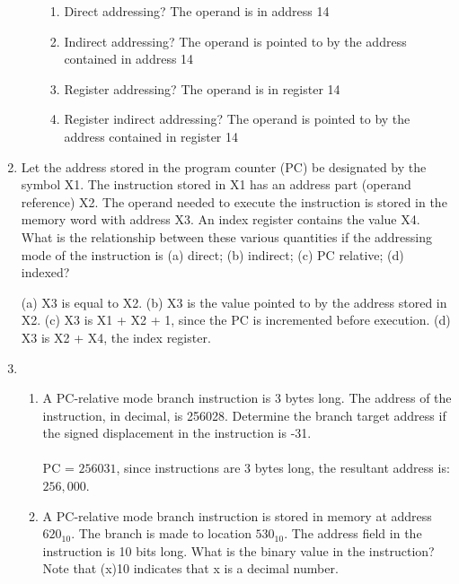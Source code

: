 \documentclass{article}
\begin{document}
\begin{enumerate}
\begin{enumerate}
\begin{enumerate}
			            \item Direct addressing?
			                  \newline The operand is in address 14

			            \item Indirect addressing?
			                  \newline The operand is pointed to by the address contained in address 14

			            \item Register addressing?
			                  \newline The operand is in register 14

			            \item Register indirect addressing?
			                  \newline The operand is pointed to by the address contained in register 14
		            \end{enumerate}
	      \end{enumerate}

	\item Let the address stored in the program counter (PC) be designated by the symbol X1. The
	      instruction stored in X1 has an address part (operand reference) X2. The operand needed to execute the
	      instruction is stored in the memory word with address X3. An index register contains the value X4. What
	      is the relationship between these various quantities if the addressing mode of the instruction is (a)
	      direct; (b) indirect; (c) PC relative; (d) indexed?

			(a) X3 is equal to X2.
		  	\newline (b) X3 is the value pointed to by the address stored in X2. 
			\newline (c) X3 is X1 + X2 + 1, since the PC is incremented before execution. 
			\newline (d) X3 is X2 + X4, the index register.

	\item
	      \begin{enumerate}
		      \item A PC-relative mode branch instruction is 3 bytes long. The address of the instruction, in
		            decimal, is 256028. Determine the branch target address if the signed displacement in the instruction is
		            -31.
				\paragraph{} PC = \(256031\), since instructions are 3 bytes long, the resultant address is: \(256,000\).
		      \item A PC-relative mode branch instruction is stored in memory at address \(620_{10}\). The branch is
		            made to location \(530_{10}\). The address field in the instruction is 10 bits long. What is the binary value in the
		            instruction? Note that (x)10 indicates that x is a decimal number.
					

\end{enumerate}
\end{enumerate}
\end{document}
